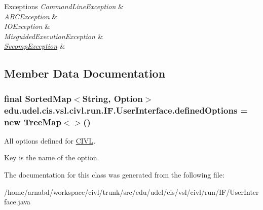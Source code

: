\begin{DoxyExceptions}{Exceptions}
{\em Command\+Line\+Exception} & \\
\hline
{\em A\+B\+C\+Exception} & \\
\hline
{\em I\+O\+Exception} & \\
\hline
{\em Misguided\+Execution\+Exception} & \\
\hline
{\em \hyperlink{classedu_1_1udel_1_1cis_1_1vsl_1_1civl_1_1run_1_1IF_1_1SvcompException}{Svcomp\+Exception}} & \\
\hline
\end{DoxyExceptions}


\subsection{Member Data Documentation}
\hypertarget{classedu_1_1udel_1_1cis_1_1vsl_1_1civl_1_1run_1_1IF_1_1UserInterface_a4a8f3dbc6341e970930ebec3d887d0f9}{}
\subsubsection[{defined\+Options}]{\setlength{\rightskip}{0pt plus 5cm}final Sorted\+Map$<$String, Option$>$ edu.\+udel.\+cis.\+vsl.\+civl.\+run.\+I\+F.\+User\+Interface.\+defined\+Options = new Tree\+Map$<$$>$()\hspace{0.3cm}{\ttfamily [static]}}\label{classedu_1_1udel_1_1cis_1_1vsl_1_1civl_1_1run_1_1IF_1_1UserInterface_a4a8f3dbc6341e970930ebec3d887d0f9}


All options defined for \hyperlink{classedu_1_1udel_1_1cis_1_1vsl_1_1civl_1_1CIVL}{C\+I\+V\+L}. 

Key is the name of the option. 

The documentation for this class was generated from the following file\+:\begin{DoxyCompactItemize}
\item 
/home/arnabd/workspace/civl/trunk/src/edu/udel/cis/vsl/civl/run/\+I\+F/User\+Interface.\+java\end{DoxyCompactItemize}

